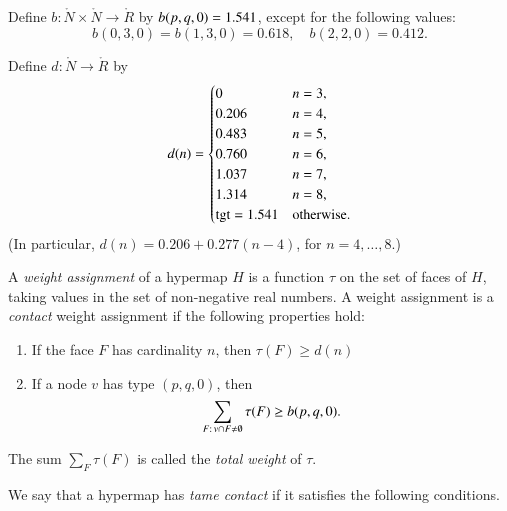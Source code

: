 \begin{definition}[b]
Define $b:\ring{N}\times \ring{N}\to \ring{R}$ by $b(p,q,0)=1.541$,   except for the following values:
$$
b(0,3,0)=b(1,3,0)=0.618,\quad b(2,2,0)=0.412.
$$
\end{definition}

\begin{definition}[d]
    Define $d:\ring{N}\to \ring{R}$ by
  $$d(n) = \begin{cases}
    0 & n=3, \\
    0.206 & n=4, \\
    0.483 & n=5, \\
    0.760 & n=6, \\
    1.037 & n=7, \\
    1.314 & n=8,\\
    {\operatorname{tgt}}=1.541 & \text{otherwise}.
  \end{cases}
  $$
(In particular, $d(n) = 0.206 + 0.277 (n-4)$, for $n=4,\ldots,8$.)
\end{definition}

\begin{definition}
%
A {\it weight assignment\/} of a hypermap $H$ is a function $\tau$ on
the set of faces of $H$, taking values in the set of non-negative
real numbers. A weight assignment is a {\it contact} weight assignment if the
following properties hold:
%
\begin{enumerate}
  \item If the face $F$ has cardinality $n$, then
        $\tau(F) \ge d(n)$
  \item If a node $v$ has type $(p,q,0)$, then
        $$\sum_{F:\,v\cap F\ne\emptyset} \tau(F) \ge b{(p,q,0)}.$$
        \label{admissible:b}
        \label{definition:admissible:excess}
\end{enumerate}
The sum $\sum_F \tau(F)$ is called the {\it total weight} of $\tau$.
\end{definition}



We say that a hypermap has {\it tame contact\/} if it satisfies the following
conditions.
%

